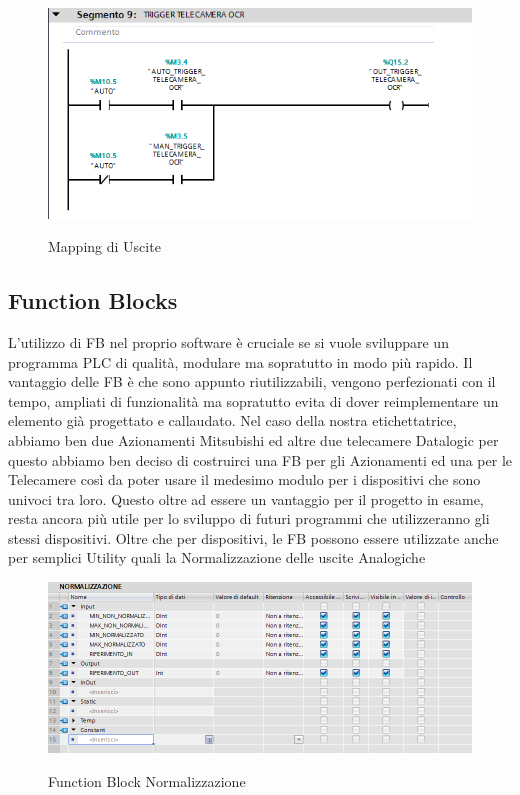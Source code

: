 \documentclass[12pt, a4paper, oneside]{book}
\begin{document}
	\begin{figure}[H]
	\centering
	\includegraphics[width=12cm]{Immagini/OUT}
	\label{OUT}
	\caption{Mapping di Uscite}
\end{figure}



\subsection{Function Blocks}
L'utilizzo di FB nel proprio software è cruciale se si vuole sviluppare un programma PLC di qualità, modulare ma sopratutto in modo più rapido. Il vantaggio delle FB è che sono appunto riutilizzabili, vengono perfezionati con il tempo, ampliati di funzionalità ma sopratutto evita di dover reimplementare un elemento già progettato e callaudato. Nel caso della nostra etichettatrice, abbiamo ben due Azionamenti Mitsubishi ed altre due telecamere Datalogic per questo abbiamo ben deciso di costruirci una FB per gli Azionamenti ed una per le Telecamere così da poter usare il medesimo modulo per i dispositivi che sono univoci tra loro. Questo oltre ad essere un vantaggio per il progetto in esame, resta ancora più utile per lo sviluppo di futuri programmi che utilizzeranno gli stessi dispositivi.
Oltre che per dispositivi, le FB possono essere utilizzate anche per semplici Utility quali la Normalizzazione delle uscite Analogiche


	\begin{figure}[H]
	\centering
	\includegraphics[width=12cm]{Immagini/FB1}
	\label{FB1}
	\caption{Function Block Normalizzazione}
\end{figure}
\end{document}

